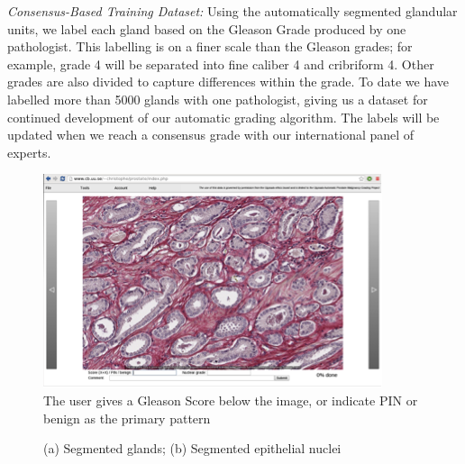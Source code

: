 \begin{enumerate}
{\textit{Consensus-Based Training Dataset: }	Using the automatically segmented glandular units, we label each gland based on the Gleason Grade produced by one pathologist. This labelling is on a finer scale than the Gleason grades; for example, grade 4 will be separated into fine caliber 4 and cribriform 4. Other grades are also divided to capture differences within the grade. To date we have labelled more than 5000 glands with one pathologist, giving us a dataset for continued development of our automatic grading algorithm. The labels will be updated when we reach a consensus grade with our international panel of experts.}

\begin{figure}[!htbp]
	\centering
	\includegraphics[width=.6\textwidth]{figures/research/userinterfaceprostate.png}
	\caption{The user gives a Gleason Score below the image, or indicate PIN or benign as the primary pattern} 
	\label{fig:userintpros}
\end{figure}

\begin{figure}[!htbp]
	\centering
	\caption{(a) Segmented glands; (b) Segmented epithelial nuclei}
	

\end{figure}
\end{enumerate}
